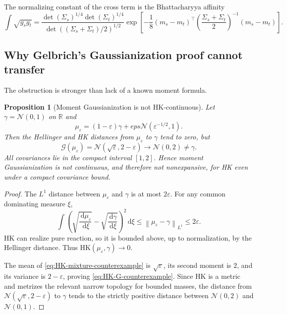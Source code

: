 \documentclass[11pt]{article}
\newtheorem{proposition}[theorem]{Proposition}
\theoremstyle{definition}
\newcommand{\R}{\mathbb R}
\newcommand{\cN}{\mathcal N}
\newcommand{\cG}{\mathcal G}
\newcommand{\eps}{\varepsilon}
\newcommand{\dd}{\,\mathrm d}
\newcommand{\norm}[1]{\left\lVert #1\right\rVert}
\begin{document}
The normalizing constant of the cross term is the Bhattacharyya affinity
\begin{equation}\label{eq:bhattacharyya}
 \int\sqrt{g_sg_t}
 =\frac{\det(\Sigma_s)^{1/4}\det(\Sigma_t)^{1/4}}
 {\det((\Sigma_s+\Sigma_t)/2)^{1/2}}
 \exp\left[-\frac18(m_s-m_t)^\top
 \left(\frac{\Sigma_s+\Sigma_t}{2}\right)^{-1}(m_s-m_t)\right].
\end{equation}

\subsection{Why Gelbrich's Gaussianization proof cannot transfer}

The obstruction is stronger than lack of a known moment formula.

\begin{proposition}[Moment Gaussianization is not HK-continuous]\label{prop:HK-counterexample}
Let $\gamma=\cN(0,1)$ on $\R$ and
\begin{equation}\label{eq:HK-mixture-counterexample}
 \mu_\eps=(1-\eps)\gamma+eps\cN(\eps^{-1/2},1).
\end{equation}
Then the Hellinger and HK distances from $\mu_\eps$ to $\gamma$ tend to zero,
but
\begin{equation}\label{eq:HK-G-counterexample}
 \cG(\mu_\eps)=\cN(\sqrt\eps,2-\eps)
 \longrightarrow\cN(0,2)\neq\gamma.
\end{equation}
All covariances lie in the compact interval $[1,2]$.  Hence moment
Gaussianization is not continuous, and therefore not nonexpansive, for HK even
under a compact covariance bound.
\end{proposition}

\begin{proof}
The $L^1$ distance between $\mu_\eps$ and $\gamma$ is at most $2\eps$.  For
any common dominating measure $\xi$,
\[
 \int\left(\sqrt{\frac{\dd\mu_\eps}{\dd\xi}}
 -\sqrt{\frac{\dd\gamma}{\dd\xi}}\right)^2\dd\xi
 \leq\norm{\mu_\eps-\gamma}_{L^1}\leq2\eps.
\]
HK can realize pure reaction, so it is bounded above, up to normalization, by
the Hellinger distance.  Thus $\mathrm{HK}(\mu_\eps,\gamma)\to0$.

The mean of \eqref{eq:HK-mixture-counterexample} is $\sqrt\eps$, its second
moment is $2$, and its variance is $2-\eps$, proving
\eqref{eq:HK-G-counterexample}.  Since HK is a metric and metrizes the relevant
narrow topology for bounded masses, the distance from
$\cN(\sqrt\eps,2-\eps)$ to $\gamma$ tends to the strictly positive distance
between $\cN(0,2)$ and $\cN(0,1)$.
\end{proof}
\end{document}
